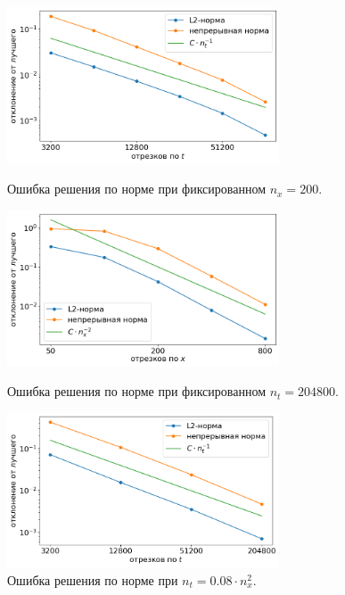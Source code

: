 \begin{figure}[!tp]
    \centering
    \includegraphics[width=0.72\textwidth]{figures/convergence_fixed_nx.png}
    \vspace{-0.2cm}
    \caption{Ошибка решения по норме при фиксированном $n_x = 200$.}
    \label{fig:convergence_fixed_nx}
    \vspace{0.6cm}
    
    \includegraphics[width=0.72\textwidth]{figures/convergence_fixed_nt.png}
    \vspace{-0.2cm}
    \caption{Ошибка решения по норме при фиксированном $n_t = 204800$.}
    \label{fig:convergence_fixed_nt}
    \vspace{0.6cm}
    
    \includegraphics[width=0.72\textwidth]{figures/convergence_connected.png}
    \vspace{-0.2cm}
    \caption{Ошибка решения по норме при $n_t = 0.08 \cdot n_x^2$.}
    \label{fig:convergence_connected}
\end{figure}

